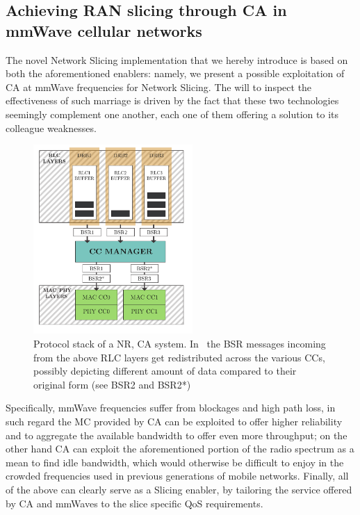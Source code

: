 \documentclass[11pt]{book}
\begin{document}
\subsection{Achieving RAN slicing through CA in mmWave cellular networks}
The novel Network Slicing implementation that we hereby introduce is based on both the aforementioned enablers: namely, we present a possible exploitation of CA at mmWave frequencies for Network Slicing. The will to inspect the effectiveness of such marriage is driven by the fact that these two technologies seemingly complement one another, each one of them offering a solution to its colleague weaknesses. 


\begin{figure}
  \begin{center}
    \includegraphics[width=0.54\textwidth]{figures/stack-figure.pdf}
  \end{center}
  \caption{Protocol stack of a NR, CA system. In~\cite{pagin2020} the BSR messages incoming from the above RLC layers get redistributed across the various CCs, possibly depicting different amount of data compared to their original form (see BSR2 and BSR2*)}
  \label{Fig:Stack}
\end{figure}
Specifically, mmWave frequencies suffer from blockages and high path loss, in such regard the MC provided by CA can be exploited to offer higher reliability and to aggregate the available bandwidth to offer even more throughput; on the other hand CA can exploit the aforementioned portion of the radio spectrum as a mean to find idle bandwidth, which would otherwise be difficult to enjoy in the crowded frequencies used in previous generations of mobile networks. Finally, all of the above can clearly serve as a Slicing enabler, by tailoring the service offered by CA and mmWaves to the slice specific QoS requirements.
\end{document}
